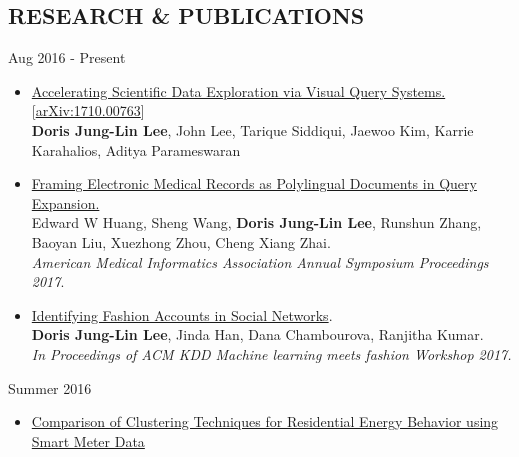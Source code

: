 \documentclass{res}
\begin{document}
\begin{resume}
\section{\large{RESEARCH \& PUBLICATIONS}}
\vspace{5pt}
\hspace{-10pt}{\normalsize\bf Graduate Student Research Assistant at UIUC} \hspace{145pt} Aug 2016 - Present
\begin{itemize}[leftmargin=0.3em]
  \item \href{https://arxiv.org/abs/1710.00763}{Accelerating Scientific Data Exploration via Visual Query Systems.} [\href{https://arxiv.org/abs/1710.00763}{arXiv:1710.00763}]
    \\ {\footnotesize\textbf{Doris Jung-Lin Lee}, John Lee, Tarique Siddiqui, Jaewoo Kim, Karrie Karahalios, Aditya Parameswaran}
    \vspace{-5pt}
  \item \href{https://amia2017.zerista.com/event/member/389402}{Framing Electronic Medical Records as Polylingual Documents in Query Expansion.} 
    \\ {\footnotesize Edward W Huang, Sheng Wang, \textbf{Doris Jung-Lin Lee}, Runshun Zhang, Baoyan Liu, Xuezhong Zhou, Cheng Xiang Zhai.
    \vspace{-5pt}
    \\ \textit{American Medical Informatics Association Annual Symposium Proceedings 2017}}.
  \item \href{https://kddfashion2017.mybluemix.net/final_submissions/ML4Fashion_paper_21.pdf}{Identifying Fashion Accounts in Social Networks}.  
    \\ {\footnotesize \textbf{Doris Jung-Lin Lee}, Jinda Han, Dana Chambourova, Ranjitha Kumar.
    \vspace{-5pt}
    \\ \textit{In Proceedings of ACM KDD Machine learning meets fashion Workshop 2017.}}
\end{itemize}
\vspace{-5pt}     
\hspace{-10pt}{\normalsize\bf Lawrence Berkeley National Lab Scientific Data Management Group} \hspace{58pt} Summer 2016
   \begin{itemize}[leftmargin=0.3em]
    \item \href{https://www.aaai.org/ocs/index.php/WS/AAAIW17/paper/view/15166/14673}{Comparison of Clustering Techniques for Residential Energy Behavior using Smart Meter Data}

\end{itemize}
\end{resume}
\end{document}
